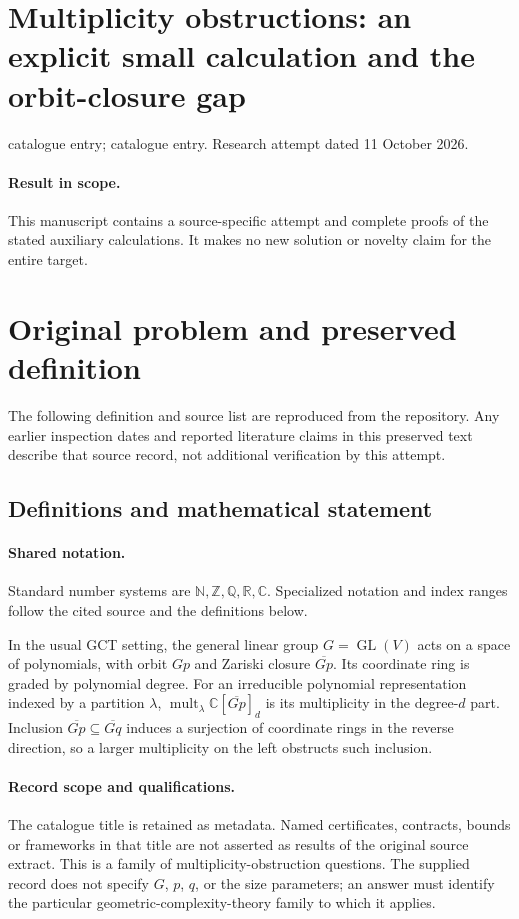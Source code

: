 \documentclass[11pt]{article}
\begin{document}
\section*{Multiplicity obstructions: an explicit small calculation and the orbit-closure gap}
\noindent catalogue entry; catalogue entry. Research attempt dated 11 October 2026.
\paragraph{Result in scope.}This manuscript contains a source-specific attempt and complete proofs of the stated auxiliary calculations. It makes no new solution or novelty claim for the entire target.
\section{Original problem and preserved definition}
The following definition and source list are reproduced from the repository. Any earlier inspection dates and reported literature claims in this preserved text describe that source record, not additional verification by this attempt.
\subsection{Definitions and mathematical statement}

\paragraph{Shared notation.}Standard number systems are $\mathbb N,\mathbb Z,\mathbb Q,\mathbb R,\mathbb C$. Specialized notation and index ranges follow the cited source and the definitions below.


In the usual GCT setting, the general linear group $G=\operatorname{GL}(V)$ acts on a space of polynomials, with orbit $Gp$ and Zariski closure $\overline{Gp}$. Its coordinate ring is graded by polynomial degree. For an irreducible polynomial representation indexed by a partition $\lambda$, $\operatorname{mult}_\lambda\mathbb C[\overline{Gp}]_d$ is its multiplicity in the degree-$d$ part. Inclusion $\overline{Gp}\subseteq\overline{Gq}$ induces a surjection of coordinate rings in the reverse direction, so a larger multiplicity on the left obstructs such inclusion.
\paragraph{Record scope and qualifications.}
The catalogue title is retained as metadata. Named certificates, contracts, bounds or frameworks in that title are not asserted as results of the original source extract.
This is a family of multiplicity-obstruction questions. The supplied record does not specify $G$, $p$, $q$, or the size parameters; an answer must identify the particular geometric-complexity-theory family to which it applies.
\end{document}

